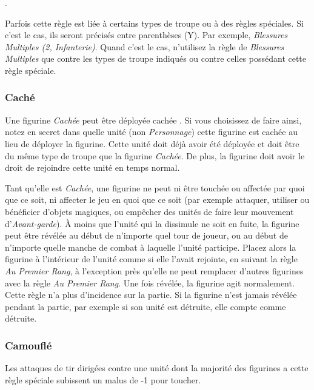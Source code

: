 .

Parfois cette règle est liée à certains types de troupe ou à des règles spéciales. Si c'est le cas, ils seront précisés entre parenthèses (Y). Par exemple, \emph{Blessures Multiples (2, Infanterie)}. Quand c'est le cas, n'utilisez la règle de \emph{Blessures Multiples} que contre les types de troupe indiqués ou contre celles possédant cette règle spéciale.

\subsubsection*{Caché}

Une figurine \emph{Cachée} peut être déployée \og cachée \fg . Si vous choisissez de faire ainsi, notez en secret dans quelle unité (non \emph{Personnage}) cette figurine est cachée au lieu de déployer la figurine. Cette unité doit déjà avoir été déployée et doit être du même type de troupe que la figurine \emph{Cachée}. De plus, la figurine doit avoir le droit de rejoindre cette unité en temps normal.

Tant qu'elle est \emph{Cachée}, une figurine ne peut ni être touchée ou affectée par quoi que ce soit, ni affecter le jeu en quoi que ce soit (par exemple attaquer, utiliser ou bénéficier d'objets magiques, ou empêcher des unités de faire leur mouvement d'\emph{Avant-garde}). À moins que l'unité qui la dissimule ne soit en fuite, la figurine peut être révélée au début de n'importe quel tour de joueur, ou au début de n'importe quelle manche de combat à laquelle l'unité participe. Placez alors la figurine à l'intérieur de l'unité comme si elle l'avait rejointe, en suivant la règle \emph{Au Premier Rang}, à l'exception près qu'elle ne peut remplacer d'autres figurines avec la règle \emph{Au Premier Rang}. Une fois révélée, la figurine agit normalement. Cette règle n'a plus d'incidence sur la partie. Si la figurine n'est jamais révélée pendant la partie, par exemple si son unité est détruite, elle compte comme détruite.

\subsubsection*{Camouflé}

Les attaques de tir dirigées contre une unité dont la majorité des figurines a cette règle spéciale subissent un malus de -1 pour toucher.

